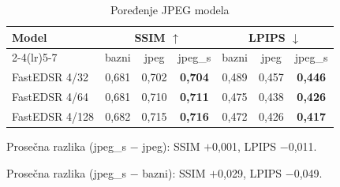 \begin{table}[H]
    \begin{tabular}{lcccccc}
        \toprule
        Model & \multicolumn{3}{c}{SSIM $\uparrow$} & \multicolumn{3}{c}{LPIPS $\downarrow$} \\
        \cmidrule(lr){2-4}\cmidrule(lr){5-7}
         & bazni & jpeg & jpeg\_s & bazni & jpeg & jpeg\_s \\
        \midrule
        FastEDSR 4/32 & 0,681 & 0,702 & \textbf{0,704} & 0,489 & 0,457 & \textbf{0,446} \\
        FastEDSR 4/64 & 0,681 & 0,710 & \textbf{0,711} & 0,475 & 0,438 & \textbf{0,426} \\
        FastEDSR 4/128 & 0,682 & 0,715 & \textbf{0,716} & 0,472 & 0,426 & \textbf{0,417} \\
        \bottomrule
    \end{tabular}
    \caption{Poređenje JPEG modela}
    \label{tab:jpeg_4x_DIV2K_jpeg_vs_s}
\end{table}

\noindent Prosečna razlika (jpeg\_s $-$ jpeg): SSIM $+$0,001, LPIPS $-$0,011.

\noindent Prosečna razlika (jpeg\_s $-$ bazni): SSIM $+$0,029, LPIPS $-$0,049.